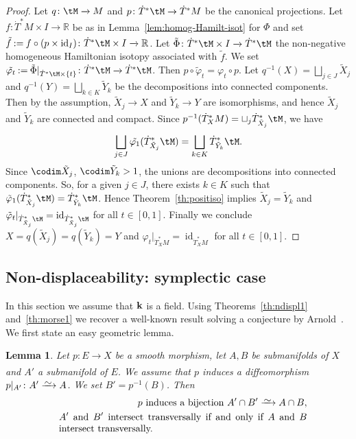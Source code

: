 \documentclass[12pt,leqno]{article}
\newtheorem{lemma}[theorem]{Lemma}
\theoremstyle{definition}
\newcommand{\R}{{\mathbb{R}}}
\def\phi{{\varphi}}
\newcommand{\cor}{{\bf k}}
\renewcommand{\to}[1][]{\xrightarrow[]{#1}}
\newcommand{\isoto}[1][]{\xrightarrow[#1]%
{{\raisebox{-.6ex}[0ex][-.6ex]{$\mspace{1mu}\sim\mspace{2mu}$}}}}
\newcommand{\opb}[1]{#1^{-1}}
\newcommand{\seteq}{\mathbin{:=}}
\newcommand{\cl}{\colon}
\newcommand{\eq}{\begin{eqnarray}}
\newcommand{\eneq}{\end{eqnarray}}
\DeclareMathOperator{\id}{id}
\newcommand{\dT}{{\dot{T}}}
\numberwithin{equation}{section}
\begin{document}
\begin{proof}
Let $q\cl\tM\to M$ 
and $p\cl\dT^*\tM\to\dT^*M$ be the canonical projections.
Let $f\cl \dT^*M\times I\to\R$ be as in Lemma~\ref{lem:homog-Hamilt-isot}
for $\Phi$ and set $\tilde{f}\seteq f\circ (p\times\id_{I})
\cl\dT^*\tM\times I\to\R$.
Let $\tilde{\Phi}\cl \dT^*\tM \times I \to \dT^*\tM$ the non-negative
homogeneous Hamiltonian isotopy associated with $\tilde{f}$.
We set 
$\tilde{\phi_t}\seteq\tilde{\Phi}\vert_{\dT^*\tM \times\{t\}}
\cl\dT^*\tM\to\dT^*\tM$. Then $p\circ \tilde{\phi}_t = \phi_t \circ p$.
Let 
$\opb{q}(X) =\bigsqcup_{j\in J}\tilde X_j$ and 
$\opb{q}(Y) =\bigsqcup_{k\in K}\tilde Y_k$
be the decompositions into connected components.
Then by the assumption, $\tilde X_j\to X$
and $\tilde Y_k\to Y$ are isomorphisms, and hence
$\tilde X_j$ and $\tilde Y_k$ are connected and compact.
Since $p^{-1}(\dT^*_XM)=\sqcup_j\dT^*_{\tilde X_j}\tM$, we have
$$\bigsqcup_{j\in J} \tilde{\phi_1}(\dT^*_{\tilde X_j}\tM)
= \bigsqcup_{k\in K} \dT^*_{\tilde Y_k}\tM.$$
Since $\codim \tilde X_j$, $\codim \tilde Y_k>1$,
the unions are decompositions into connected components.
So, for a given $j\in J $, there exists  $k\in K$ such that
$\tilde\phi_1(\dT^*_{\tilde X_j}\tM) = \dT^*_{\tilde Y_k}\tM$. 
Hence Theorem~\ref{th:positiso} implies $\tilde X_j=\tilde Y_k$ and 
$\tilde\phi_t|_{\dT^*_{\tilde X_j}\tM} = \id_{\dT^*_{\tilde X_j}\tM}$
for all $t\in[0,1]$.
Finally we conclude $X=q(\tilde X_j)=q(\tilde Y_k)=Y$ and
$\phi_t|_{\dT^*_XM} = \id_{\dT^*_XM}$ for all $t\in[0,1]$.
\end{proof}

\subsection{Non-displaceability:  symplectic case}
\label{sec:sympl-case}
In this section we assume that $\cor$ is a field.
Using Theorems~\ref{th:ndispl1} and~\ref{th:morse1} we recover a well-known
result solving a conjecture by Arnold~\cite{Cha83, CZ83, Fe97, Ho85, LS85}.
We first state an easy geometric lemma.
\begin{lemma}\label{lem:pullback-pushforward}
Let $p\cl E \to X$ be a smooth morphism, let $A,B$ be submanifolds of $X$
and $A'$ a submanifold of $E$.
We assume that $p$ induces a diffeomorphism $p|_{A'}\cl A'\isoto A$.
We set $B'=\opb{p}(B)$. Then
\eq
&&\text{$p$ induces a bijection $A'\cap B' \isoto A\cap B$}, 
\label{eq:morseNH1}\\
&& \text{\parbox[t]{60ex}{$A'$ and $B'$ intersect transversally 
if and only if $A$ and $B$ intersect transversally.}}
\label{eq:morseNH2}
\eneq
\end{lemma}
\end{document}

